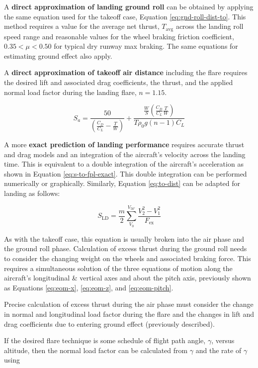 \documentclass[
]{book}
\begin{document}
A \textbf{direct approximation of landing ground roll} can be obtained by applying the
same equation used for the takeoff case, Equation \eqref{eq:gnd-roll-dist-to}. This method requires a value for
the average net thrust, \(T_{\text{avg}}\) across the landing roll speed range and
reasonable values for the wheel braking friction coefficient,
\(0.35 < \mu < 0.50\) for typical dry runway max braking. The same equations
for estimating ground effect also apply.

A \textbf{direct approximation of takeoff air distance} including the flare requires
the desired lift and associated drag coefficients, the thrust, and the applied
normal load factor during the landing flare, \(n = 1.15\).

\[
S_a = \frac{50}{\left( \frac{C_D}{C_L} - \frac{T}{W} \right)} + \frac{ \frac{W}{S} \left( \frac{C_D}{C_L} \frac{T}{W} \right) }{T \rho_0  g \left( n - 1 \right) C_L }
\label{eq:approx-air-dist-land}
\]

A more \textbf{exact prediction of landing performance} requires accurate thrust and
drag models and an integration of the aircraft's velocity across the landing
time. This is equivalent to a double integration of the aircraft's acceleration
as shown in Equation \eqref{eq:s-to-fpl-exact}. This double integration can be performed
numerically or graphically. Similarly, Equation \eqref{eq:to-dist} can be adapted
for landing as follows:

\[
S_{\mathrm{LD}} = \frac{m}{2} \sum_{V_0}^{V_{50'}} \frac{V^2_2 - V^2_1}{F_{\text{ex}}}
\label{eq:land-dist}
\]

As with the takeoff case, this equation is usually broken into the air phase and
the ground roll phase. Calculation of excess thrust during the ground roll needs
to consider the changing weight on the wheels and associated braking force. This
requires a simultaneous solution of the three equations of motion along the
aircraft's longitudinal \& vertical axes and about the pitch axis, previously
shown as Equations \eqref{eq:eom-x}, \eqref{eq:eom-z}, and \eqref{eq:eom-pitch}.

Precise calculation of excess thrust during the air phase must consider the
change in normal and longitudinal load factor during the flare and the changes
in lift and drag coefficients due to entering ground effect (previously
described).

If the desired flare technique is some schedule of flight path angle,
\(\gamma\), versus altitude, then the normal load factor can be calculated from
\(\gamma\) and the rate of \(\gamma\) using
\end{document}
